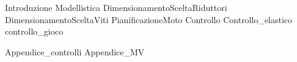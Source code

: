 \documentclass{miaclasse}
\begin{document}
\primapag

\pagestyle{fancy}





\renewcommand*\contentsname{Indice}
\tableofcontents


{Introduzione}
{Modellistica}
{DimensionamentoSceltaRiduttori}
{DimensionamentoSceltaViti}
{PianificazioneMoto}
{Controllo}
{Controllo_elastico}
{controllo_gioco}

\appendix
{Appendice_controlli}
{Appendice_MV}
\end{document}
